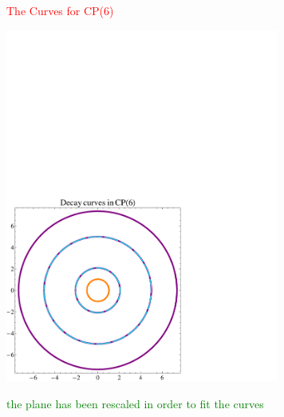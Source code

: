 \documentclass[12pt,letterpaper,landscape,KOMA,smallheadings,calcdimensions,display]{powersem}
\begin{document}
\begin{slide}

\centerline{\textcolor{red}{\Large The Curves for CP(6)}}

\vspace{-4.5cm}
\begin{center}
\hspace{2.5cm}
\includegraphics[width=9.0cm]{ccp6.pdf}
\end{center}

\centerline{\textcolor{green}{\small the plane has been rescaled in order to fit the curves}}

\end{slide}
\end{document}
